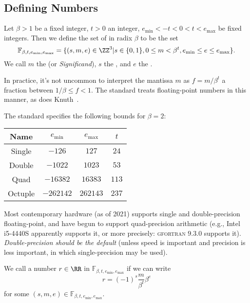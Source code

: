 \subsection{Defining Numbers}
\begin{defn}
  Let $\beta>1$ be a fixed integer, $t>0$ an integer,
  $e_{\text{min}}<-t<0<t<e_{\text{max}}$ be
  fixed integers. Then we define the set of 
  in radix $\beta$ to be the set
  \begin{equation}
    \mathbb{F}_{\beta,t,e_{\text{min}},e_{\text{max}}} = \{(s,m,e)\in\ZZ^{3}|
    s\in\{0,1\}, 0\leq m<\beta^{t}, e_{\text{min}}\leq e\leq e_{\text{max}}\}.
  \end{equation}
  We call $m$ the  (or \emph{Significand}), $s$ the
  , and $e$ the .
\end{defn}
\begin{ddanger}
  In practice, it's not uncommon to interpret the mantissa $m$ as
  $f=m/\beta^{t}$ a fraction between $1/\beta\leq f<1$. The 
  standard treats floating-point numbers in this manner, as does
  Knuth~\cite{taocp2}.
\end{ddanger}
\begin{rmk}
  The  standard specifies the following bounds for $\beta=2$:
  \begin{center}
    \begin{tabular}{|c|c|c|c|}
      Name   & $e_{\text{min}}$ & $e_{\text{max}}$ & $t$ \\\hline
      Single & $-126$         & $127$          & $24$\\
      Double & $-1022$        & $1023$         & $53$\\
      Quad   & $-16382$       & $16383$        & $113$\\
      Octuple & $-262142$     & $262143$       & $237$
    \end{tabular}
  \end{center}
  Most contemporary hardware (as of 2021) supports single and
  double-precision floating-point, and have begun to support
  quad-precision arithmetic (e.g., Intel i5-4440S apparently supports
  it, or more precisely: \textsc{gfortran} $9.3.0$ supports
  it). \emph{Double-precision should be the default} (unless speed is important
  and precision is less important, in which single-precision may be used).
\end{rmk}
\begin{defn}
  We call a number $r\in\RR$  in
  $\mathbb{F}_{\beta,t,e_{\text{min}},e_{\text{max}}}$ if we can write
  \begin{equation}
    r = (-1)^{s}\frac{m}{\beta^{t}}\beta^{e}
  \end{equation}
  for some $(s,m,e)\in\mathbb{F}_{\beta,t,e_{\text{min}},e_{\text{max}}}$.
\end{defn}
